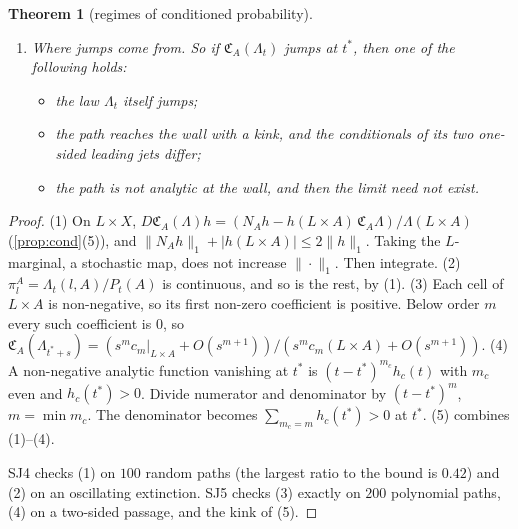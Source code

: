 \documentclass[11pt]{article}
\newtheorem{theorem}{Theorem}\newtheorem{proposition}[theorem]{Proposition}\newtheorem{lemma}[theorem]{Lemma}\newtheorem{corollary}[theorem]{Corollary}\newtheorem{conjecture}[theorem]{Conjecture}
\theoremstyle{definition}\newtheorem{definition}[theorem]{Definition}\newtheorem{remark}[theorem]{Remark}\newtheorem{example}[theorem]{Example}
\begin{document}
\begin{theorem}[regimes of conditioned probability]
\begin{enumerate}
  through $t^*$, and its two one-sided limits agree.
\item[(5)] \emph{Where jumps come from.} So if $\mathfrak C_A(\Lambda_t)$ jumps at $t^*$, then one of the following holds:
  \begin{itemize}
  \item the law $\Lambda_t$ itself jumps;
  \item the path reaches the wall with a kink, and the conditionals of its two one-sided leading jets differ;
  \item the path is not analytic at the wall, and then the limit need not exist.
  \end{itemize}
\end{enumerate}
\end{theorem}

\begin{proof}
(1) On $L\times X$, $D\mathfrak C_A(\Lambda)h=(N_Ah-h(L\times A)\,\mathfrak C_A\Lambda)/\Lambda(L\times A)$ (\cref{prop:cond}(5)), and
$\|N_Ah\|_1+|h(L\times A)|\le2\|h\|_1$. Taking the $L$-marginal, a stochastic map, does not increase $\|\cdot\|_1$. Then integrate.
(2) $\pi^A_l=\Lambda_t(l,A)/P_t(A)$ is continuous, and so is the rest, by (1).
(3) Each cell of $L\times A$ is non-negative, so its first non-zero coefficient is positive. Below order $m$ every such coefficient is $0$, so
$\mathfrak C_A(\Lambda_{t^*+s})=(s^mc_m|_{L\times A}+O(s^{m+1}))/(s^mc_m(L\times A)+O(s^{m+1}))$.
(4) A non-negative analytic function vanishing at $t^*$ is $(t-t^*)^{m_c}h_c(t)$ with $m_c$ even and $h_c(t^*)>0$. Divide numerator and
denominator by $(t-t^*)^m$, $m=\min m_c$. The denominator becomes $\sum_{m_c=m}h_c(t^*)>0$ at $t^*$.
(5) combines (1)--(4).

SJ4 checks (1) on $100$ random paths (the largest ratio to the bound is $0.42$) and (2) on an oscillating extinction. SJ5 checks (3)
exactly on $200$ polynomial paths, (4) on a two-sided passage, and the kink of (5).
\end{proof}
\end{document}
